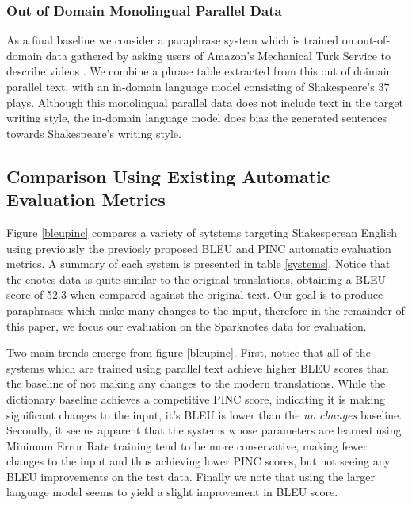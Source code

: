 \documentclass[10pt,a5paper,twoside]{article}
\begin{document}
\subsubsection{Out of Domain Monolingual Parallel Data}
As a final baseline we consider a paraphrase system which is trained on out-of-domain data gathered by asking users of Amazon's Mechanical Turk Service 
\cite{Snow08} to describe videos \cite{chen11}.  We combine a phrase table extracted from this out of doimain parallel text, with an in-domain
language model consisting of Shakespeare's 37 plays.  Although this monolingual parallel data does not include text in the target writing style,
the in-domain language model does bias the generated sentences towards Shakespeare's writing style.

\subsection{Comparison Using Existing Automatic Evaluation Metrics}
Figure \ref{bleupinc} compares a variety of sytstems targeting Shakesperean English using previously the previosly proposed BLEU \cite{Papineni02} and PINC \cite{chen11} automatic evaluation metrics.  A summary of each system is presented in table \ref{systems}.  Notice that the enotes data is quite similar to the original translations,
obtaining a BLEU score of 52.3 when compared against the original text.  Our goal is to produce paraphrases which make many changes to the input, therefore
in the remainder of this paper, we focus our evaluation on the Sparknotes data for evaluation.

Two main trends emerge from figure \ref{bleupinc}.  First, notice that all of the systems which are trained using parallel text achieve higher BLEU scores than the baseline
of not making any changes to the modern translations.  While the dictionary baseline achieves a competitive PINC score, indicating it is making significant changes to the 
input, it's BLEU is lower than the \emph{no changes} baseline.  Secondly, it seems apparent that the systems whose parameters are learned using Minimum Error Rate training
tend to be more conservative, making fewer changes to the input and thus achieving lower PINC scores, but not seeing any BLEU improvements on the test data.  Finally
we note that using the larger language model seems to yield a slight improvement in BLEU score.
\end{document}
